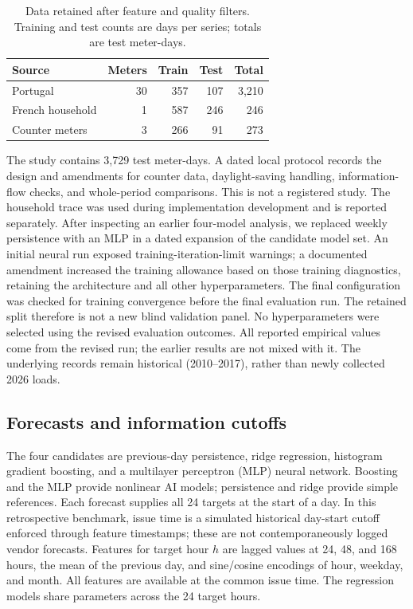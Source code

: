 \documentclass[12pt]{article}
\begin{document}
\begin{table}[t]
\centering\normalsize
\caption{Data retained after feature and quality filters. Training and
test counts are days per series; totals are test meter-days.}
\label{tab:data}
\begin{tabular}{lrrrr}
\toprule
Source & Meters & Train & Test & Total\\
\midrule
Portugal & 30 & 357 & 107 & 3,210\\
French household & 1 & 587 & 246 & 246\\
Counter meters & 3 & 266 & 91 & 273\\
\bottomrule
\end{tabular}
\end{table}

The study contains 3,729 test meter-days. A dated local protocol records
the design and amendments for counter data, daylight-saving handling,
information-flow checks, and whole-period comparisons. This is not a
registered study. The household trace was used during implementation
development and is reported separately. After inspecting an earlier
four-model analysis, we replaced weekly persistence with an MLP in a
dated expansion of the candidate model set. An initial neural run exposed training-iteration-limit
warnings; a documented amendment increased the training allowance based
on those training diagnostics, retaining the architecture and all other
hyperparameters. The final configuration was checked for training convergence
before the final evaluation run. The retained split therefore is not a new blind
validation panel. No hyperparameters were selected using the revised
evaluation outcomes. All reported empirical values come from the revised
run; the earlier results are not mixed with it. The underlying records
remain historical (2010--2017), rather than newly collected 2026 loads.


\subsection{Forecasts and information cutoffs}
The four candidates are previous-day persistence, ridge regression,
histogram gradient boosting, and a multilayer perceptron (MLP) neural
network. Boosting and the MLP provide nonlinear AI models; persistence and
ridge provide simple references. Each forecast supplies all 24 targets at
the start of a day. In this retrospective benchmark, issue time is a
simulated historical day-start cutoff enforced through feature timestamps;
these are not contemporaneously logged vendor forecasts.
Features for target hour $h$ are lagged values at 24, 48, and 168 hours,
the mean of the previous day, and sine/cosine encodings of hour, weekday,
and month. All features are available at the common issue time. The
regression models share parameters across the 24 target hours.
\end{document}
